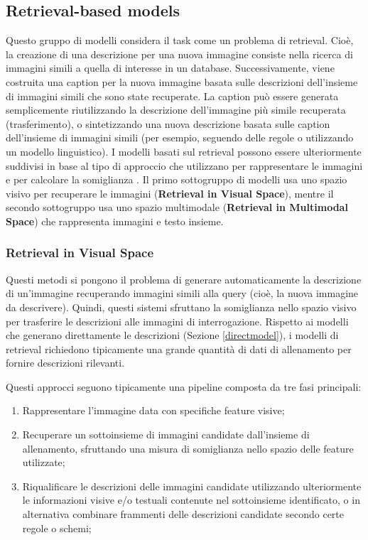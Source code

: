 \subsection{Retrieval-based models}
Questo gruppo di modelli considera il task come un problema di retrieval. Cioè, la creazione di una descrizione per una nuova immagine consiste nella ricerca di immagini simili a quella di interesse in un database. Successivamente, viene costruita una caption per la nuova immagine basata sulle descrizioni dell'insieme di immagini simili che sono state recuperate. La caption può essere generata semplicemente riutilizzando la descrizione dell'immagine più simile recuperata (trasferimento), o sintetizzando una nuova descrizione basata sulle caption dell'insieme di immagini simili (per esempio, seguendo delle regole o utilizzando un modello linguistico). I modelli basati sul retrieval possono essere ulteriormente suddivisi in base al tipo di approccio che utilizzano per rappresentare le immagini e per calcolare la somiglianza \cite{bernardi2016automatic}. Il primo sottogruppo di modelli usa uno spazio visivo per recuperare le immagini (\textbf{Retrieval in Visual Space}), mentre il secondo sottogruppo usa uno spazio multimodale (\textbf{Retrieval in Multimodal Space}) che rappresenta immagini e testo insieme.

\subsubsection{Retrieval in Visual Space}\label{retreivalvisualspace}
Questi metodi si pongono il problema di generare automaticamente la descrizione di un'immagine recuperando immagini simili alla query (cioè, la nuova immagine da descrivere). Quindi, questi sistemi sfruttano la somiglianza nello spazio visivo per trasferire le descrizioni alle immagini di interrogazione. Rispetto ai modelli che generano direttamente le descrizioni (Sezione \ref{directmodel}), i modelli di retrieval richiedono tipicamente una grande quantità di dati di allenamento per fornire descrizioni rilevanti.

Questi approcci seguono tipicamente una pipeline composta da tre fasi principali:
\begin{enumerate}
\item Rappresentare l'immagine data con specifiche feature visive;
\item Recuperare un sottoinsieme di immagini candidate dall'insieme di allenamento, sfruttando una misura di somiglianza nello spazio delle feature utilizzate;
\item Riqualificare le descrizioni delle immagini candidate utilizzando ulteriormente le informazioni visive e/o testuali contenute nel sottoinsieme identificato, o in alternativa combinare frammenti delle descrizioni candidate secondo certe regole o schemi;
\end{enumerate}



